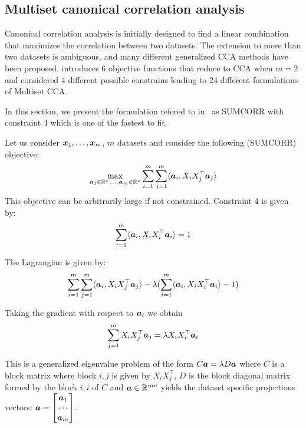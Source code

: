 \subsection{Multiset canonical correlation analysis}
\label{sec:mcca}
Canonical correlation analysis is initially designed to find a linear
combination that maximizes the correlation between two datasets.
The extension to more than two datasets is ambiguous, and many
different generalized CCA methods have been proposed. \cite{kettenring1971canonical} introduces 6 objective functions that reduce to CCA when $m=2$ and \cite{nielsen2002multiset} considered 4 different possible constrains leading to 24 different formulations of Multiset CCA.

In this section, we present the formulation refered to
in~\cite{nielsen2002multiset} as SUMCORR with constraint 4 which is one of the
fastest to fit.

Let us consider $\boldsymbol{x}_1, \dots, \boldsymbol{x}_m$, $m$ datasets and consider the following (SUMCORR)
objective:
\begin{align}
  \max_{\boldsymbol{a}_1 \in \mathbb{R}^{v}, \dots, \boldsymbol{a}_m \in \mathbb{R}^{v}} \sum_{i=1}^m \sum_{j=1}^m \langle{ \boldsymbol{a}_i },{ X_i X_j^{\top} \boldsymbol{a}_j }\rangle
\end{align}
This objective can be arbitrarily large if not constrained. Constraint 4 is
given by:
\begin{align}
  \sum_{i=1}^m \langle{ \boldsymbol{a}_i },{ X_i X_i^{\top} \boldsymbol{a}_i }\rangle = 1
\end{align}

The Lagrangian is given by:
\begin{align}
  \sum_{i=1}^m \sum_{j=1}^m \langle{ \boldsymbol{a}_i },{ X_i X_j^{\top} \boldsymbol{a}_j }\rangle - \lambda (\sum_{i=1}^m
  \langle{ \boldsymbol{a}_i },{X_i X_i^{\top} \boldsymbol{a}_i }\rangle - 1)
\end{align}

Taking the gradient with respect to $\boldsymbol{a}_i$ we obtain
\begin{align}
  \sum_{j=1}^m X_i X_j^{\top} \boldsymbol{a}_j = \lambda X_i X_i^{\top} \boldsymbol{a}_i
\end{align}

This is a generalized eigenvalue problem of the form $C \boldsymbol{a} = \lambda D \boldsymbol{a}$
where $C$ is a block matrix where block $i,j$ is given by $X_i X_j^{\top}$, 
$D$ is the block diagonal matrix formed by the block $i, i$ of $C$ and $\boldsymbol{a} \in
\mathbb{R}^{mv}$ yields the dataset specific projections vectors: $\boldsymbol{a} = \begin{bmatrix} \boldsymbol{a}_1 \\ \cdots \\
  \boldsymbol{a}_m \end{bmatrix}$.

